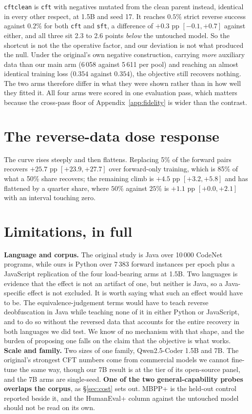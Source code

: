 \documentclass{article}
\newcommand{\arm}[1]{\texttt{#1}}
\begin{document}
\arm{cftclean} is \arm{cft} with negatives mutated from the clean parent instead, identical in
every other respect, at 1.5B and seed 17. It reaches $0.5\%$ strict reverse success against
$0.2\%$ for both \arm{cft} and \arm{sft}, a difference of $+0.3$ pp $[-0.1,+0.7]$ against either,
and all three sit 2.3 to 2.6 points \emph{below} the untouched model. So the shortcut is not the
the operative factor, and our deviation is not what produced the null. Under the original's own
negative construction, carrying \emph{more} auxiliary data than our main arm (6\,058 against
5\,611 per pool) and reaching an almost identical training loss ($0.354$ against $0.354$), the
objective still recovers nothing. The two arms therefore differ in what they were shown rather
than in how well they fitted it. All four arms were scored in one evaluation pass, which matters
because the cross-pass floor of Appendix~\ref{app:fidelity} is wider than the contrast.

\section{The reverse-data dose response}
\label{app:dose}

The curve rises steeply and then flattens. Replacing 5\% of the forward pairs recovers
$+25.7$ pp $[+23.9,+27.7]$ over forward-only training, which is 85\% of what a 50\% share
recovers; the remaining climb is $+4.5$ pp $[+3.2,+5.8]$ and has flattened by a quarter
share, where $50\%$ against $25\%$ is $+1.1$ pp $[+0.0,+2.1]$ with an interval touching zero.

\section{Limitations, in full}
\label{app:limits}

\textbf{Language and corpus.} The original study is Java over 10\,000 CodeNet programs,
while ours is Python over 7\,383 forward instances per epoch plus a JavaScript replication
of the four load-bearing arms at 1.5B. Two languages is evidence that the effect is not an
artifact of one, but neither is Java, so a Java-specific effect is not excluded. It is worth
saying what such an effect would have to be. The equivalence-judgement terms would have to
teach reverse deobfuscation in Java while teaching none of it in either Python or
JavaScript, and to do so without the reversed data that accounts for the entire recovery in
both languages we did test. We know of no mechanism with that shape, and the burden of
proposing one falls on the claim that the objective is what works.
\textbf{Scale and family.} Two sizes of one family, Qwen2.5-Coder 1.5B and 7B. The
original's strongest CFT numbers come from commercial models we cannot fine-tune the same
way, though our 7B result is at the tier of its open-source panel, and the 7B arms are
single-seed. 
\textbf{One of the two general-capability probes overlaps the corpus}, as \S\ref{sec:cost} sets
out. MBPP+ is the held-out control reported beside it, and the HumanEval+ column against the
untouched model should not be read on its own.
\end{document}
